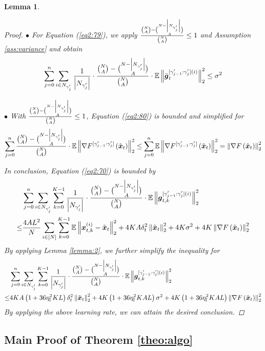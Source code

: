 \documentclass{article}
\theoremstyle{plain}
\newtheorem{lemma}[theorem]{Lemma}
\theoremstyle{definition}
\theoremstyle{remark}
\newcommand{\E}{\mathbb{E}}
\renewcommand{\eqref}[1]{Equation (\ref{#1})}
\newcommand{\bracket}[1]{\left(#1\right)}
\newcommand{\norm}[1]{\left\|#1\right\|_2^2}
\newcommand{\globaloutergradgammacons}[2]{\nabla F^{[\gamma_{#1-1}': \gamma_{#1}']}\bracket{\x{#2}}}
\begin{document}
\begin{lemma}
\begin{proof}
$\bullet$ For \eqref{eq2:79}, we apply $\frac{\binom{N}{A} - \binom{N - \left|N_{\gamma_{j}'}\right|}{A}}{\binom{N}{A}} \leq 1$ and Assumption \ref{ass:variance} and obtain
\begin{align}
\sum_{j=0}^{n} \sum_{i \in \n{j}} \frac{1}{\left|\n{j}\right|} \cdot \frac{\binom{N}{A} - \binom{N - \left|\n{j}\right|}{A}}{\binom{N}{A}} \cdot \E\norm{ \Ddot{\boldsymbol{g}}_{t}^{[\gamma_{j-1}':\gamma_{j}'](i)} }  \leq \sigma^2
\end{align}

$\bullet$ With $\frac{\binom{N}{A} - \binom{N - \left|N_{\gamma_{j}'}\right|}{A}}{\binom{N}{A}} \leq 1$, \eqref{eq2:80} is bounded and simplified for
\begin{align}
\sum_{j=0}^{n} \frac{\binom{N}{A} - \binom{N - \left|\n{j}\right|}{A}}{\binom{N}{A}} \cdot \E\norm{\globaloutergradgammacons{j}{t}} \leq \sum_{j=0}^{n} \E\norm{\globaloutergradgammacons{j}{t}} = \norm{\grad{t}}
\end{align}

In conclusion, \eqref{eq2:70} is bounded by
\begin{align}
& \sum_{j=0}^{n} \sum_{i \in \n{j}} \sum_{k=0}^{K-1} \frac{1}{\left|\n{j}\right|} \cdot \frac{\binom{N}{A} - \binom{N - \left|\n{j}\right|}{A}}{\binom{N}{A}} \cdot \E \norm{\boldsymbol{g}_{t,k}^{[\gamma_{j-1}':\gamma_{j}'](i)}} \\
\leq & \frac{4A L^2}{N} \sum_{i \in [N]} \sum_{k=0}^{K-1} \E\norm{\x{i}{t}{k} - \x{t}} + 4 K A \delta_t^2 \norm{\x{t}} + 4K\sigma^2 + 4K \norm{\grad{t}}
\end{align}
By applying Lemma \ref{lemma:2}, we further simplify the inequality for 
\begin{align}
& \sum_{j=0}^{n} \sum_{i \in \n{j}} \sum_{k=0}^{K-1} \frac{1}{\left|\n{j}\right|} \cdot \frac{\binom{N}{A} - \binom{N - \left|\n{j}\right|}{A}}{\binom{N}{A}} \cdot \E \norm{\boldsymbol{g}_{t,k}^{[\gamma_{j-1}':\gamma_{j}'](i)}} \\
\leq & 4 K A \bracket{1 + 36 \eta_l^2 K L} \delta_t^2 \norm{\x{t}} + 4 K \bracket{1 + 36 \eta_l^2 K A L} \sigma^2 + 4 K \bracket{1 + 36 \eta_l^2 K A L} \norm{\grad{t}}
\end{align}
By applying the above learning rate, we can attain the desired conclusion. 
\end{proof}
\end{lemma}

\subsection{Main Proof of Theorem \ref{theo:algo}}
\end{document}
